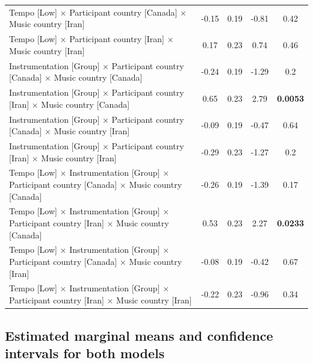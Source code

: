 \documentclass[
  bookmarksnumbered]{article}
\begin{document}
\begin{table}[H]
{\begin{tabular}[t]{lcccc}
\hspace{1em}Tempo [Low] × Participant country [Canada] × Music country [Iran] & -0.15 & 0.19 & -0.81 & 0.42\\
\hspace{1em}Tempo [Low] × Participant country [Iran] × Music country [Iran] & 0.17 & 0.23 & 0.74 & 0.46\\
\hspace{1em}Instrumentation [Group] × Participant country [Canada] × Music country [Canada] & -0.24 & 0.19 & -1.29 & 0.2\\
\hspace{1em}Instrumentation [Group] × Participant country [Iran] × Music country [Canada] & 0.65 & 0.23 & 2.79 & \textbf{0.0053}\\
\hspace{1em}Instrumentation [Group] × Participant country [Canada] × Music country [Iran] & -0.09 & 0.19 & -0.47 & 0.64\\
\hspace{1em}Instrumentation [Group] × Participant country [Iran] × Music country [Iran] & -0.29 & 0.23 & -1.27 & 0.2\\
\hspace{1em}Tempo [Low] × Instrumentation [Group] × Participant country [Canada] × Music country [Canada] & -0.26 & 0.19 & -1.39 & 0.17\\
\hspace{1em}Tempo [Low] × Instrumentation [Group] × Participant country [Iran] × Music country [Canada] & 0.53 & 0.23 & 2.27 & \textbf{0.0233}\\
\hspace{1em}Tempo [Low] × Instrumentation [Group] × Participant country [Canada] × Music country [Iran] & -0.08 & 0.19 & -0.42 & 0.67\\
\hspace{1em}Tempo [Low] × Instrumentation [Group] × Participant country [Iran] × Music country [Iran] & -0.22 & 0.23 & -0.96 & 0.34\\
\bottomrule
\end{tabular}}
\end{table}

\hypertarget{estimated-marginal-means-and-confidence-intervals-for-both-models}{%
\subsection{Estimated marginal means and confidence intervals for both models}\label{estimated-marginal-means-and-confidence-intervals-for-both-models}}
\end{document}
